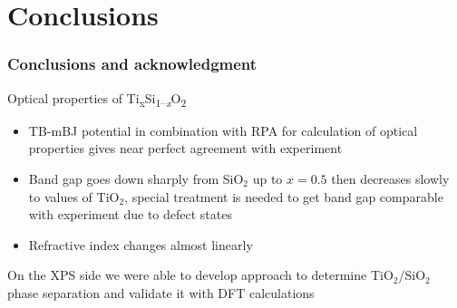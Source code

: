\documentclass[noamsthm,8pt,t,xcolor={dvipsnames}]{beamer}
\def\TiSiO{Ti\textsubscript{x}Si\textsubscript{1--\itshape x}O\textsubscript{2}}
\begin{document}
\section{Conclusions}
\begin{frame}
   \frametitle{Conclusions and acknowledgment}
   Optical properties of \TiSiO{}
   \begin{itemize}
      \item TB-mBJ potential in combination with RPA for calculation of optical properties gives near perfect agreement with experiment
      \item Band gap goes down sharply from SiO$_2$ up to $x = 0.5$ then decreases slowly to values of TiO$_2$, special treatment is needed to get band gap comparable with experiment due to defect states
      \item Refractive index changes almost linearly 
   \end{itemize}
   On the XPS side we were able to develop approach to determine TiO$_2$/SiO$_2$ phase separation and validate it with DFT calculations

   \vspace{0.5cm}

\end{frame}
\end{document}
